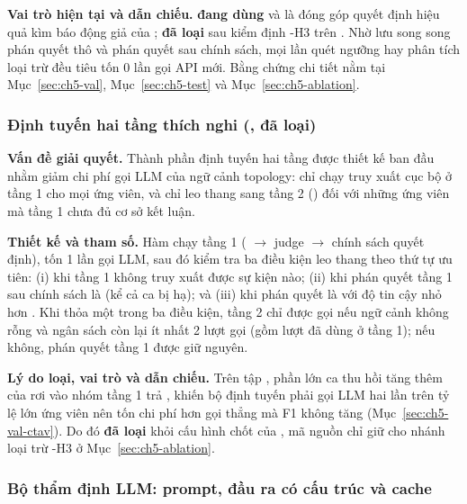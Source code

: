 \textbf{Vai trò hiện tại và dẫn chiếu.} \textbf{ đang dùng} và là đóng góp quyết định hiệu quả kìm báo động giả của \CTAV{}; \textbf{ đã loại} sau kiểm định \hyp{H3} trên . Nhờ lưu song song phán quyết thô và phán quyết sau chính sách, mọi lần quét ngưỡng hay phân tích loại trừ đều tiêu tốn $0$ lần gọi API mới. Bằng chứng chi tiết nằm tại Mục~\ref{sec:ch5-val}, Mục~\ref{sec:ch5-test} và Mục~\ref{sec:ch5-ablation}.

\subsubsection{Định tuyến hai tầng thích nghi (, đã loại)}
\label{sec:ch4-c4}

\textbf{Vấn đề giải quyết.} Thành phần định tuyến hai tầng \textbf{} được thiết kế ban đầu nhằm giảm chi phí gọi LLM của ngữ cảnh topology: chỉ chạy truy xuất cục bộ  ở tầng 1 cho mọi ứng viên, và chỉ leo thang sang tầng 2 () đối với những ứng viên mà tầng 1 chưa đủ cơ sở kết luận.

\textbf{Thiết kế và tham số.} Hàm  chạy tầng 1 ( $\to$ judge $\to$ chính sách quyết định), tốn 1 lần gọi LLM, sau đó kiểm tra ba điều kiện leo thang theo thứ tự ưu tiên: (i)  khi tầng 1 không truy xuất được sự kiện nào; (ii)  khi phán quyết tầng 1 sau chính sách là  (kể cả ca bị  hạ); và (iii)  khi phán quyết là  với độ tin cậy nhỏ hơn . Khi thỏa một trong ba điều kiện, tầng 2 chỉ được gọi nếu ngữ cảnh  không rỗng và ngân sách còn lại ít nhất 2 lượt gọi (gồm lượt đã dùng ở tầng 1); nếu không, phán quyết tầng 1 được giữ nguyên.

\textbf{Lý do loại, vai trò và dẫn chiếu.} Trên tập , phần lớn ca thu hồi tăng thêm của  rơi vào nhóm tầng 1 trả , khiến bộ định tuyến phải gọi LLM hai lần trên tỷ lệ lớn ứng viên nên tốn chi phí hơn gọi thẳng  mà F1 không tăng (Mục~\ref{sec:ch5-val-ctav}). Do đó \textbf{ đã loại} khỏi cấu hình chốt của \CTAV{}, mã nguồn chỉ giữ cho nhánh loại trừ \hyp{H3} ở Mục~\ref{sec:ch5-ablation}.

\subsubsection{Bộ thẩm định LLM: prompt, đầu ra có cấu trúc và cache}
\label{sec:ch4-judge}

